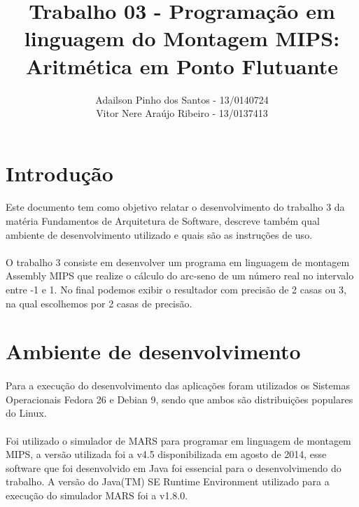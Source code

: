 \documentclass[a4paper, 12pt]{article}
\begin{document}
\title{Trabalho 03 - Programa\c{c}\~ao em linguagem do Montagem MIPS: Aritm\'etica em Ponto Flutuante}
\author{Adailson Pinho dos Santos - 13/0140724\\
Vitor Nere Ara\'ujo Ribeiro - 13/0137413}
\date{}
\maketitle

\newpage

\tableofcontents

\newpage

\section{Introdu\c{c}\~ao}
	\paragraph{}	Este documento tem como objetivo relatar o desenvolvimento do trabalho 3 da mat\'eria Fundamentos de Arquitetura de Software, descreve tamb\'em qual ambiente de desenvolvimento utilizado e quais s\~ao as instru\c{c}\~oes de uso. 
	\paragraph{}	O trabalho 3 consiste em desenvolver um programa em linguagem de montagem Assembly MIPS que realize o c\'alculo do arc-seno de um n\'umero real no intervalo entre -1 e 1. No final podemos exibir o resultador com precisão de 2 casas ou 3, na qual escolhemos por 2 casas de precis\~ao. 
\section{Ambiente de desenvolvimento}
    \paragraph{}	Para a execu\c{c}\~ao do desenvolvimento das aplica\c{c}\~oes foram utilizados os Sistemas Operacionais Fedora 26 e Debian 9, sendo que ambos s\~ao distribui\c{c}\~oes populares do Linux. 
    \paragraph{}	Foi utilizado o simulador de MARS para programar em linguagem de montagem MIPS, a vers\~ao utilizada foi a v4.5 disponibilizada em agosto de 2014, esse software que foi desenvolvido em Java foi essencial para o desenvolvimendo do trabalho. A vers\~ao do Java(TM) SE Runtime Environment utilizado para a execu\c{c}\~ao do simulador MARS foi a v1.8.0.
\end{document}
